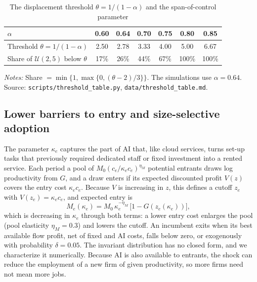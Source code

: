 \begin{table}[t]
  \centering
  \caption{The displacement threshold $\theta = 1/(1-\alpha)$ and the span-of-control parameter}
  \label{tab:alpha-threshold}
  \begin{tabular}{lcccccc}
    \toprule
    $\alpha$ & 0.60 & 0.64 & 0.70 & 0.75 & 0.80 & 0.85 \\
    \midrule
    Threshold $\theta = 1/(1-\alpha)$ & 2.50 & 2.78 & 3.33 & 4.00 & 5.00 & 6.67 \\
    Share of $\mathcal{U}(2,5)$ below $\theta$ & 17\% & 26\% & 44\% & 67\% & 100\% & 100\% \\
    \bottomrule
  \end{tabular}
  \par\smallskip
  \parbox{0.85\linewidth}{\footnotesize \textit{Notes:} Share $= \min\{1, \max\{0, (\theta - 2)/3\}\}$. The simulations use $\alpha = 0.64$. Source: \texttt{scripts/threshold\_table.py}, \texttt{data/threshold\_table.md}.}
\end{table}

\subsection{Lower barriers to entry and size-selective adoption}\label{sec:ai-entry}

The parameter $\kappa_e$ captures the part of AI that, like cloud services, turns set-up tasks that previously required dedicated staff or fixed investment into a rented service.
Each period a pool of $M_0 (c_e / \kappa_e c_e)^{\eta_M}$ potential entrants draws log productivity from $G$, and a draw enters if its expected discounted profit $V(z)$ covers the entry cost $\kappa_e c_e$.
Because $V$ is increasing in $z$, this defines a cutoff $z_e$ with $V(z_e) = \kappa_e c_e$, and expected entry is
\begin{equation}\label{eq:entry-mass}
  M_e(\kappa_e) = M_0\, \kappa_e^{-\eta_M}\, \bigl[1 - G(z_e(\kappa_e))\bigr],
\end{equation}
which is decreasing in $\kappa_e$ through both terms: a lower entry cost enlarges the pool (pool elasticity $\eta_M = 0.3$) and lowers the cutoff.
An incumbent exits when its best available flow profit, net of fixed and AI costs, falls below zero, or exogenously with probability $\delta = 0.05$.
The invariant distribution has no closed form, and we characterize it numerically.
Because AI is also available to entrants, the shock can reduce the employment of a new firm of given productivity, so more firms need not mean more jobs.

